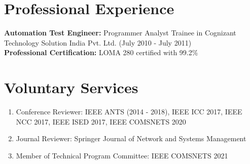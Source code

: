 \documentclass{article}
\begin{document}
\section{Professional Experience}
	{\bf Automation Test Engineer:} Programmer Analyst Trainee in Cognizant Technology Solution India Pvt. Ltd. (July 2010 - July 2011)\\[3ex]
	{\bf Professional Certification:} LOMA 280 certified with 99.2\%         
\section{Voluntary Services}
  \begin{enumerate}
   \item Conference Reviewer: IEEE ANTS (2014 - 2018), IEEE ICC 2017, IEEE NCC 2017, IEEE ISED 2017, IEEE COMSNETS 2020
   \item Journal Reviewer: Springer Journal of Network and Systems Management
   \item Member of Technical Program Committee: IEEE  COMSNETS 2021
  \end{enumerate}

   \nocite{*}
  
  
\end{document}

